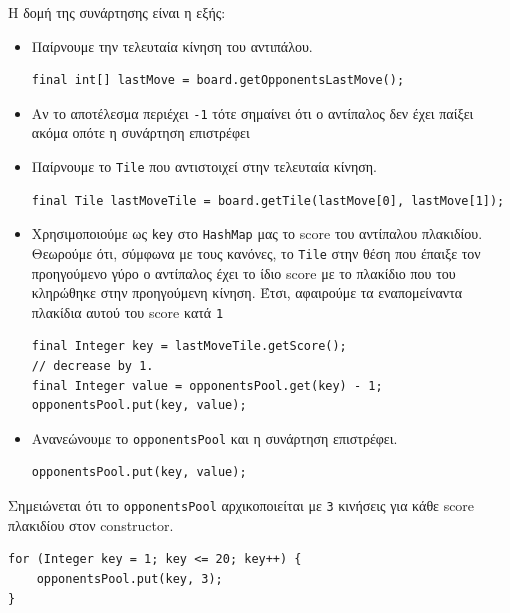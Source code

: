 Η δομή της συνάρτησης είναι η εξής:
\begin{itemize}
\item Παίρνουμε την τελευταία κίνηση του αντιπάλου.
\begin{lstlisting}[breaklines=true, numbers=none, aboveskip=\smallskipamount, belowskip=\smallskipamount, captionpos=none]
final int[] lastMove = board.getOpponentsLastMove();
\end{lstlisting}

\item Αν το αποτέλεσμα περιέχει \lstinline!-1! τότε σημαίνει ότι ο αντίπαλος δεν έχει παίξει ακόμα οπότε η συνάρτηση επιστρέφει

\item Παίρνουμε το \lstinline!Tile! που αντιστοιχεί στην τελευταία κίνηση.
\begin{lstlisting}[breaklines=true, numbers=none, aboveskip=\smallskipamount, belowskip=\smallskipamount, captionpos=none]
final Tile lastMoveTile = board.getTile(lastMove[0], lastMove[1]);
\end{lstlisting}

\item Χρησιμοποιούμε ως \lstinline!key! στο \lstinline!HashMap! μας το score του αντίπαλου πλακιδίου.
Θεωρούμε ότι, σύμφωνα με τους κανόνες, το \lstinline!Tile! στην θέση που έπαιξε τον προηγούμενο γύρο ο αντίπαλος έχει το ίδιο score με το πλακίδιο που του κληρώθηκε στην προηγούμενη κίνηση.
Έτσι, αφαιρούμε τα εναπομείναντα πλακίδια αυτού του score κατά \lstinline!1!
\begin{lstlisting}[breaklines=true, numbers=none, aboveskip=\smallskipamount, belowskip=\smallskipamount, captionpos=none]
final Integer key = lastMoveTile.getScore();
// decrease by 1.
final Integer value = opponentsPool.get(key) - 1;
opponentsPool.put(key, value);
\end{lstlisting}

\item Ανανεώνουμε το \lstinline!opponentsPool! και η συνάρτηση επιστρέφει.
\begin{lstlisting}[breaklines=true, numbers=none, aboveskip=\smallskipamount, belowskip=\smallskipamount, captionpos=none]
opponentsPool.put(key, value);
\end{lstlisting}
\end{itemize}

Σημειώνεται ότι το \lstinline!opponentsPool! αρχικοποιείται με \lstinline!3! κινήσεις για κάθε score πλακιδίου στον constructor.
\begin{lstlisting}[breaklines=true, numbers=none, aboveskip=\smallskipamount, belowskip=\smallskipamount, captionpos=none]
for (Integer key = 1; key <= 20; key++) {
    opponentsPool.put(key, 3);
}
\end{lstlisting}
